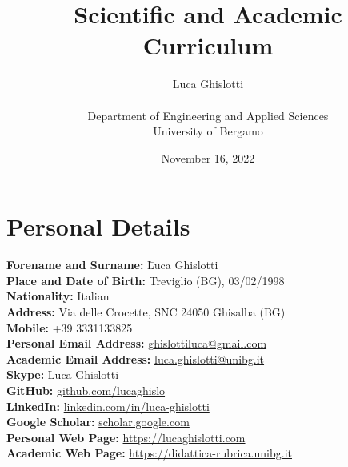 \documentclass[11pt]{article}
\title{\huge Scientific and Academic Curriculum%
}
\author{\vspace{0.2cm}\begin{huge}Luca Ghislotti\end{huge}\\\vspace{0.1cm} Department of Engineering and Applied Sciences\\University of Bergamo}
\date{November 16, 2022}
\begin{document}
\maketitle
\thispagestyle{fancy}

\onehalfspacing

\section*{Personal Details}
\begin{tabbing}
\hspace{8pt}\textbf{Forename and Surname: } \= Luca Ghislotti\\
\hspace{6pt}\textbf{Place and Date of Birth: } \> Treviglio (BG), 03/02/1998\\
\hspace{76.5pt}\textbf{Nationality: } \>Italian\\
\hspace{94pt}\textbf{Address: } Via delle Crocette, SNC 24050 Ghisalba (BG)\\
\hspace{100.5pt}\textbf{Mobile: } +39 3331133825\\
\hspace{6.5pt}\textbf{Personal Email Address: } \href{mailto:ghislottiluca@gmail.com}{ghislottiluca@gmail.com}\\
\hspace{0pt}\textbf{Academic Email Address: } \href{mailto:l.ghislotti@studenti.unibg.it}{luca.ghislotti@unibg.it}\\
\hspace{105pt}\textbf{Skype: } \href{https://join.skype.com/invite/m1XvXqe82tbO}{Luca Ghislotti}\\
\hspace{96.5pt}\textbf{GitHub: } \href{https://github.com/lucaghislo}{github.com/lucaghislo}\\
\hspace{89.5pt}\textbf{LinkedIn: } \href{https://www.linkedin.com/in/luca-ghislotti/}{linkedin.com/in/luca-ghislotti}\\
\hspace{55.5pt}\textbf{Google Scholar: } \href{https://scholar.google.com/citations?user=Xt1\_bCYAAAAJ}{scholar.google.com}\\
\hspace{31.5pt}\textbf{Personal Web Page: } \href{https://lucaghislotti.com}{https://lucaghislotti.com}\\
\hspace{25pt}\textbf{Academic Web Page: } \href{https://didattica-rubrica.unibg.it/ugov/person/135728}{https://didattica-rubrica.unibg.it} 
\end{tabbing}
\end{document}

